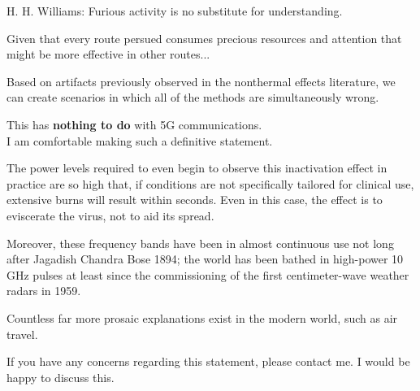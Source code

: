 \documentclass[paper.tex]{subfiles}
\begin{document}
\null\begin{tabular}[t]{l@{}}
	  \\
	
\end{tabular}




H. H. Williams: Furious activity is no substitute for understanding.

Given that every route persued consumes precious resources and attention that might be more effective in 
other routes...



Based on artifacts previously observed in the nonthermal effects literature, we can create scenarios in which all of the methods are simultaneously wrong. 





\begin{autem}
	
	{\Large {This has \textbf{nothing to do} with 5G communications.}}\\
	
	I am comfortable making such a definitive statement.
	
	The power levels required to even begin to observe this inactivation effect in practice are so high that, if conditions are not specifically tailored for clinical use, extensive burns will result within seconds. Even in this case, the effect is to eviscerate the virus, not to aid its spread. 
	
	Moreover, these frequency bands have been in almost continuous use not long after Jagadish Chandra Bose 1894; the world has been bathed in high-power 10 GHz pulses at least since the commissioning of the first centimeter-wave weather radars in 1959. 
	
	Countless far more prosaic explanations exist in the modern world, such as air travel.
	
	If you have any concerns regarding this statement, please contact me. I would be happy to discuss this.
	
\end{autem}
\end{document}

